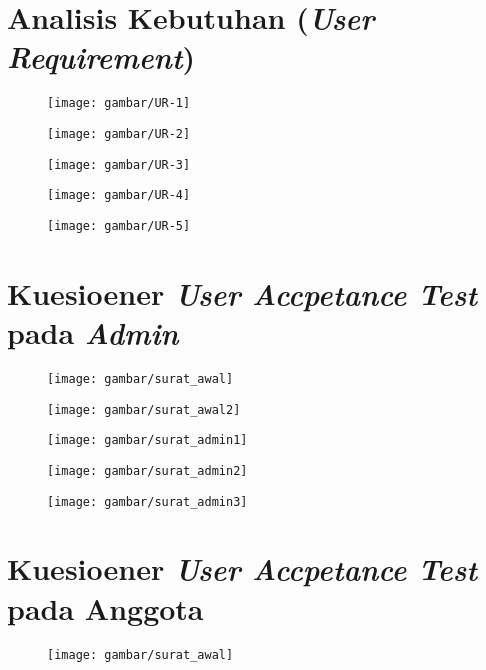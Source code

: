 \appendix 
\chapter{Analisis Kebutuhan (\textit{User Requirement})}
\begin{figure}[H]
	\centering
	\texttt{[image: gambar/UR-1]}	
\end{figure}
\begin{figure}[H]
	\centering
	\texttt{[image: gambar/UR-2]}	
\end{figure}
\begin{figure}[H]
	\centering
	\texttt{[image: gambar/UR-3]}	
\end{figure}
\begin{figure}[H]
	\centering
	\texttt{[image: gambar/UR-4]}	
\end{figure}
\begin{figure}[H]
	\centering
	\texttt{[image: gambar/UR-5]}	
\end{figure}

\chapter{Kuesioener \textit{User Accpetance Test} pada \textit{Admin}}
\begin{figure}[H]
	\centering
	\texttt{[image: gambar/surat\_awal]}	
\end{figure}

\begin{figure}[H]
	\centering
	\texttt{[image: gambar/surat\_awal2]}	
\end{figure}

\begin{figure}[H]
	\centering
	\texttt{[image: gambar/surat\_admin1]}	
\end{figure}

\begin{figure}[H]
	\centering
	\texttt{[image: gambar/surat\_admin2]}	
\end{figure}

\begin{figure}[H]
	\centering
	\texttt{[image: gambar/surat\_admin3]}	
\end{figure}

\chapter{Kuesioener \textit{User Accpetance Test} pada Anggota}
\begin{figure}[H]
	\centering
	\texttt{[image: gambar/surat\_awal]}	
\end{figure}


